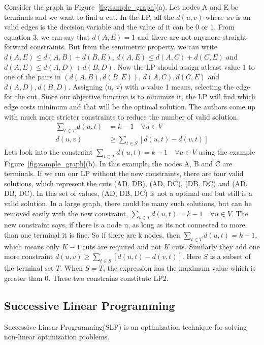 \documentclass[11pt]{article}
\begin{document}
Consider the graph in Figure~\ref{fig:sample_graph}(a). Let nodes A and E be terminals and we want to find a cut. In the LP, all the $d(u,v)$ where $uv$ is an valid edges is the decision variable and the value of it can be 0 or 1. From equation 3, we can say that $d(A, E) = 1$ and there are not anymore straight forward constraints. But from the semimetric property, we can write $d(A, E) \le d(A, B) + d(B, E)$, $d(A, E) \le d(A, C) + d(C, E)$ and $d(A, E) \le d(A, D) + d(B, D)$. Now the LP should assign atleast value 1 to one of the pairs in $(d(A, B), d(B, E))$, $d(A, C), d(C, E)$ and $d(A, D), d(B, D)$. Assigning (u, v) with a value 1 means, selecting the edge for the cut. Since our objective function is to minimize it, the LP will find which edge costs minimum and that will be the optimal solution. The authors come up with much more stricter constraints to reduce the number of valid solution.
\begin{align}
\sum\limits_{t \in T}{d(u, t)} &= k - 1 \quad \forall u \in V\\
d(u, v) &\ge \sum\limits_{t \in S}{[d(u, t) - d(v, t)]}
\end{align}
 Lets look into the constraint $\sum\limits_{t \in T}{d(u, t)} = k - 1 \quad \forall u \in V$ using the example Figure~\ref{fig:sample_graph}(b). In this example, the nodes A, B and C are terminals. If we run our LP without the new constraints, there are four valid solutions, which represent the cuts {(AD, DB), (AD, DC), (DB, DC) and (AD, DB, DC)}. In this set of values, (AD, DB, DC) is not a optimal one but still is a valid solution. In a large graph, there could be many such solutions, but can be removed easily with the new constraint, $\sum\limits_{t \in T}{d(u, t)} = k - 1 \quad \forall u \in V$. The new constraint says, if there is a node u, as long as its not connected to more than one terminal it is fine. So if there are k nodes, then $\sum\limits_{t \in T}{d(u, t)} = k - 1$, which means only $K-1$ cuts are required and not $K$ cuts. Similarly they add one more constraint $d(u, v) \ge \sum\limits_{t \in S}{[d(u, t) - d(v, t)]}$. Here $S$ is a subset of the terminal set $T$. When $S = T$, the expression has the maximum value which is greater than 0. These two constrains constitute LP2.

\subsection{Successive Linear Programming}
Successive Linear Programming(SLP) is an optimization technique for solving non-linear optimization problems. 
\end{document}
